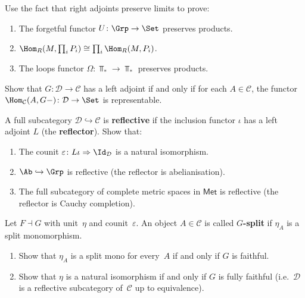 \begin{exercise}\label{exer:radj-preserves-lim-examples}
Use the fact that right adjoints preserve limits to prove:
\begin{enumerate}[label=(\alph*)]
\item The forgetful functor $U\colon\Grp\to\Set$ preserves products.
\item $\Hom_R(M,\prod_i P_i)\cong\prod_i\Hom_R(M,P_i)$.
\item The loops functor $\Omega\colon\Top_*\to\Top_*$ preserves products.
\end{enumerate}
\end{exercise}

\begin{exercise}\label{exer:adj-iff-representable}
Show that $G\colon\mathcal{D}\to\mathcal{C}$ has a left adjoint
if and only if for each $A\in\mathcal{C}$, the functor
$\Hom_\mathcal{C}(A,G-)\colon\mathcal{D}\to\Set$ is representable.
\end{exercise}

\begin{exercise}\label{exer:reflective-subcategory}
A full subcategory $\mathcal{D}\hookrightarrow\mathcal{C}$ is
\textbf{reflective} if the inclusion functor $\iota$ has a left adjoint
$L$ (the \textbf{reflector}).  Show that:
\begin{enumerate}[label=(\alph*)]
\item The counit $\varepsilon\colon L\iota\Rightarrow\Id_\mathcal{D}$
    is a natural isomorphism.
\item $\Ab\hookrightarrow\Grp$ is reflective (the reflector is abelianisation).
\item The full subcategory of complete metric spaces in $\mathsf{Met}$
    is reflective (the reflector is Cauchy completion).
\end{enumerate}
\end{exercise}

\begin{exercise}\label{exer:fixed-points-adjunction}
Let $F\dashv G$ with unit~$\eta$ and counit~$\varepsilon$.
An object $A\in\mathcal{C}$ is called \textbf{$G$-split} if
$\eta_A$ is a split monomorphism.
\begin{enumerate}[label=(\alph*)]
\item Show that $\eta_A$ is a split mono for every~$A$ if and only if
    $G$ is faithful.
\item Show that $\eta$ is a natural isomorphism if and only if
    $G$ is fully faithful (i.e.\ $\mathcal{D}$ is a reflective
    subcategory of~$\mathcal{C}$ up to equivalence).
\end{enumerate}
\end{exercise}

